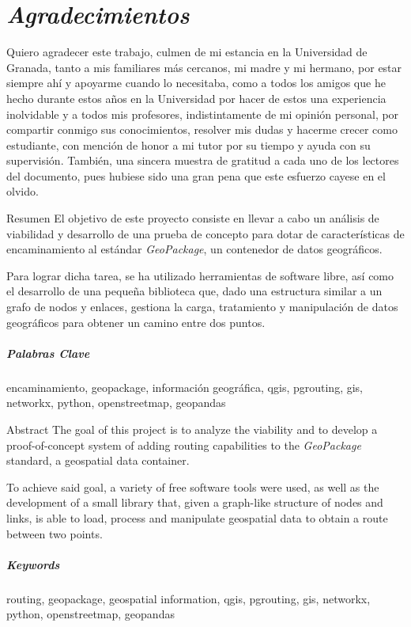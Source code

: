 \begin{minipage}[c]{0.5275\textwidth}
\itshape
\chapter*{\itshape Agradecimientos}
	Quiero agradecer este trabajo, culmen de mi estancia en la Universidad de Granada, tanto a mis familiares más cercanos, mi madre y mi hermano, por estar siempre ahí y apoyarme cuando lo necesitaba, como a todos los amigos que he hecho durante estos años en la Universidad por hacer de estos una experiencia inolvidable y a todos mis profesores, indistintamente de mi opinión personal, por compartir conmigo sus conocimientos, resolver mis dudas y hacerme crecer como estudiante, con mención de honor a mi tutor por su tiempo y ayuda con su supervisión.
	También, una sincera muestra de gratitud a cada uno de los lectores del documento, pues hubiese sido una gran pena que este esfuerzo cayese en el olvido.\par
\end{minipage}

\blankpage

\begin{poliabstract}{Resumen}
	El objetivo de este proyecto consiste en llevar a cabo un análisis de viabilidad y desarrollo de una prueba de concepto para dotar de características de encaminamiento al estándar \textit{GeoPackage}, un contenedor de datos geográficos. 
	
	Para lograr dicha tarea, se ha utilizado herramientas de software libre, así como el desarrollo de una pequeña biblioteca que, dado una estructura similar a un grafo de nodos y enlaces, gestiona la carga, tratamiento y manipulación de datos geográficos para obtener un camino entre dos puntos.

\paragraph*{Palabras Clave}
	encaminamiento, geopackage, información geográfica, qgis, pgrouting, gis, networkx, python, openstreetmap, geopandas\par
\end{poliabstract}

\begin{poliabstract}{Abstract}
	The goal of this project is to analyze the viability and to develop a proof-of-concept system of adding routing capabilities to the \textit{GeoPackage} standard, a geospatial data container. 
	
	To achieve said goal, a variety of free software tools were used, as well as the development of a small library that, given a graph-like structure of nodes and links, is able to load, process and manipulate geospatial data to obtain a route between two points.

\paragraph*{Keywords}
	routing, geopackage, geospatial information, qgis, pgrouting, gis, networkx, python, openstreetmap, geopandas\par
\end{poliabstract}

\blankpage
